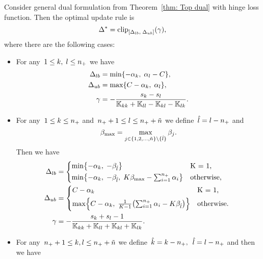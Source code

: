 \begin{theorem}\label{thm:Update rule TopPushK with hinge loss}
  Consider general dual formulation from Theorem~\ref{thm: Top dual} with hinge loss function. Then the optimal update rule is
  \begin{equation*}
    \Delta^{*} = \clip{\Delta_{lb}}{\Delta_{ub}}{\gamma},
  \end{equation*}
  where there are the following cases:
  \begin{itemize}
    \item For any~$1 \le k,\; l \le n_{+}$ we have
    \begin{align*}
      \Delta_{lb} & = \min\{- \alpha_k,\; \alpha_l - C\}, \\
      \Delta_{ub} & = \max\{C - \alpha_k,\; \alpha_l \}, \\
      \gamma      & = -\frac{s_k - s_l}{\mathbb{K}_{kk} + \mathbb{K}_{ll} - \mathbb{K}_{kl} - \mathbb{K}_{lk}}.
    \end{align*}
    \item For any~$1 \le k \le n_{+}$ and~$n_{+} + 1 \le l \le n_{+} + \tilde{n}$ we define~$\hat{l} = l - n_{+}$ and
    \begin{equation*}
      \beta_{\max} = \max_{j \in \{1, 2, \ldots, \tilde{n} \} \setminus \{\hat{l}\}} \beta_j.
    \end{equation*}
    Then we have
    \begin{align*}
      \Delta_{lb} & = 
        \begin{cases*}
          \min \Brac[c]{- \alpha_k,\;  -\beta_{\hat{l}}} & K = 1, \\
          \min \Brac[c]{- \alpha_k,\;  -\beta_{\hat{l}}, \; K\beta_{\max} - \sum_{i = 1}^{\npos} \alpha_i} & \textrm{otherwise},
        \end{cases*} \\
      \Delta_{ub} & = 
        \begin{cases*}
            C - \alpha_k & K = 1, \\
            \max \Brac[c]{C - \alpha_k, \; \frac{1}{K-1}\Brac{\sum_{i = 1}^{\npos} \alpha_i - K \beta_{\hat{l}}}}  & \textrm{otherwise}.
        \end{cases*} \\
      \gamma & = - \frac{s_k + s_l - 1}{\K_{kk} + \K_{ll} + \K_{kl} + \K_{lk}}.
    \end{align*}
    \item For any~$n_{+} + 1\le k,l \le n_{+} + \tilde{n}$ we define~$\hat{k} = k - n_{+},$~$\hat{l} = l - n_{+}$ and then we have

\end{itemize}
\end{theorem}

